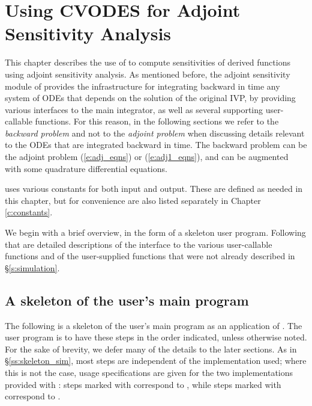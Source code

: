 \chapter{Using CVODES for Adjoint Sensitivity Analysis}\label{s:adjoint}

This chapter describes the use of {\cvodes} to compute sensitivities of derived 
functions using adjoint sensitivity analysis. As mentioned before, the adjoint
sensitivity module of {\cvodes} provides the infrastructure for integrating
backward in time any system of ODEs that depends on the solution of the original
IVP, by providing various interfaces to the main {\cvodes} integrator, as well 
as several supporting user-callable functions. For this reason, in the following
sections we refer to the {\em backward problem} and not to the 
{\em adjoint problem} when discussing details relevant to the ODEs that
are integrated backward in  time. The backward problem can be the adjoint problem
(\ref{e:adj_eqns}) or (\ref{e:adj1_eqns}), and
can be augmented with some quadrature differential equations.

{\cvodes} uses various constants for both input and output.  These are
defined as needed in this chapter, but for convenience are also listed
separately in Chapter \ref{c:constants}.

We begin with a brief overview, in the form of a skeleton user program.
Following that are detailed descriptions of the interface to the
various user-callable functions and of the user-supplied functions that were not already
described in \S\ref{s:simulation}.
\section{A skeleton of the user's main program}\label{ss:skeleton_adj}
The following is a skeleton of the user's main program as an application of
{\cvodes}. The user program is to have these steps in the order indicated, 
unless otherwise noted. For the sake of brevity, we defer many of the details to 
the later sections.
As in \S\ref{ss:skeleton_sim}, most steps are independent of the {\nvector}
implementation used; where this is not the case, usage specifications are given for the
two implementations provided with {\cvodes}: steps marked with {\p} correspond to 
{\nvecp}, while steps marked with {\s} correspond to {\nvecs}.

